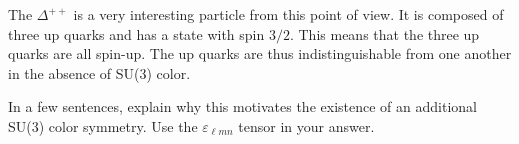 \documentclass[12pt]{article}
\begin{document}
The $\Delta^{++}$ is a very interesting particle from this point of view. It is composed of three up quarks and has a state with spin $3/2$. This means that the three up quarks are all spin-up. The up quarks are thus indistinguishable from one another in the absence of SU(3) color.

In a few sentences, explain why this motivates the existence of an additional SU(3) color symmetry. Use the $\varepsilon_{\ell m n}$ tensor in your answer.



%
%
%
%
%
%
%
%
%
\end{document}
